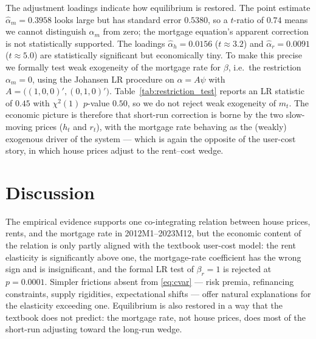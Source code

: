 \documentclass[12pt]{article}
\begin{document}
The adjustment loadings indicate how equilibrium is restored. The point estimate $\hat\alpha_m=0.3958$ looks large but has standard error $0.5380$, so a $t$-ratio of $0.74$ means we cannot distinguish $\alpha_m$ from zero; the mortgage equation's apparent correction is not statistically supported. The loadings $\hat\alpha_h=0.0156$ ($t\approx 3.2$) and $\hat\alpha_r=0.0091$ ($t\approx 5.0$) are statistically significant but economically tiny. To make this precise we formally test weak exogeneity of the mortgage rate for $\beta$, i.e.\ the restriction $\alpha_m=0$, using the Johansen LR procedure on $\alpha = A\psi$ with $A=\bigl((1,0,0)',(0,1,0)'\bigr)$. Table~\ref{tab:restriction_test} reports an LR statistic of $0.45$ with $\chi^2(1)$ $p$-value $0.50$, so we do not reject weak exogeneity of $m_t$. The economic picture is therefore that short-run correction is borne by the two slow-moving prices ($h_t$ and $r_t$), with the mortgage rate behaving as the (weakly) exogenous driver of the system --- which is again the opposite of the user-cost story, in which house prices adjust to the rent--cost wedge.



\section{Discussion}\label{sec:p2-discussion}

The empirical evidence supports one co-integrating relation between house prices, rents, and the mortgage rate in 2012M1--2023M12, but the economic content of the relation is only partly aligned with the textbook user-cost model: the rent elasticity is significantly above one, the mortgage-rate coefficient has the wrong sign and is insignificant, and the formal LR test of $\beta_r=1$ is rejected at $p=0.0001$. Simpler frictions absent from \eqref{eq:cvar} --- risk premia, refinancing constraints, supply rigidities, expectational shifts --- offer natural explanations for the elasticity exceeding one. Equilibrium is also restored in a way that the textbook does not predict: the mortgage rate, not house prices, does most of the short-run adjusting toward the long-run wedge.


\end{document}
